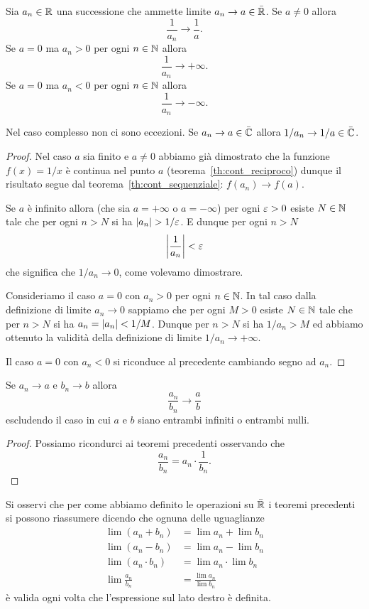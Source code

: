 \begin{theorem}
\label{th:limite_reciproco}
\mymark{**}
Sia $a_n\in \mathbb R$ una successione che ammette limite $a_n \to a\in \bar {\mathbb R}$.
Se $a\neq 0$ allora
\[
  \frac{1}{a_n} \to \frac{1}{a}.
\]
Se $a = 0$ ma $a_n>0$ per ogni $n\in \mathbb N$ allora
\[
  \frac{1}{a_n} \to +\infty.
\]
Se $a=0$ ma $a_n<0$ per ogni $n\in \mathbb N$ allora
\[
  \frac{1}{a_n} \to -\infty.
\]

Nel caso complesso non ci sono eccezioni.
Se $a_n\to a \in \bar {\mathbb C}$ allora $1/a_n \to 1/a\in \bar {\mathbb C}$.
\end{theorem}
%
\begin{proof}
\mymark{*}
Nel caso $a$ sia finito e $a\neq 0$ abbiamo già dimostrato
che la funzione $f(x)=1/x$ è continua nel punto $a$
(teorema~\ref{th:cont_reciproco}) dunque
il risultato segue dal
teorema~\ref{th:cont_sequenziale}: $f(a_n)\to f(a)$.

Se $a$ è infinito allora
(che sia $a=+\infty$ o $a=-\infty$)
per ogni $\varepsilon > 0$ esiste $N\in \mathbb N$ tale che per ogni $n>N$ si ha
${\left|a_n\right|} > 1/\varepsilon$. E dunque per ogni $n>N$
\[
{\left|\frac{1}{a_n}\right|} < \varepsilon
\]
che significa che $1/a_n \to 0$, come volevamo dimostrare.

Consideriamo il caso $a=0$ con $a_n>0$ per ogni $n\in \mathbb N$. In tal caso
dalla definizione di limite $a_n \to 0$ sappiamo che
per ogni $M>0$ esiste $N\in \mathbb N$ tale che per $n>N$ si ha
$a_n = {\left|a_n\right|} < 1/M$. Dunque per $n>N$ si ha $1/a_n > M$ ed
abbiamo ottenuto la validità della definizione di limite $1/a_n \to +\infty$.

Il caso $a=0$ con $a_n<0$ si riconduce al precedente cambiando
segno ad $a_n$.
\end{proof}

\begin{theorem}
\label{th:limite_rapporto}
\mymark{**}
Se $a_n \to a$ e $b_n\to b$ allora
\[
  \frac{a_n}{b_n} \to \frac{a}{b}
\]
escludendo il caso in cui $a$ e $b$ siano entrambi infiniti o entrambi nulli.
\end{theorem}
%
\begin{proof}
\mymark{*}
Possiamo ricondurci ai teoremi precedenti osservando che
\[
   \frac{a_n}{b_n} = a_n \cdot \frac{1}{b_n}.
\]
\end{proof}

Si osservi che
per come abbiamo definito le operazioni
su $\bar {\mathbb R}$
i teoremi precedenti si possono riassumere dicendo
che ognuna delle uguaglianze
\begin{align*}
\lim (a_n + b_n)
&= \lim a_n + \lim b_n \\
\lim (a_n - b_n)
&= \lim a_n - \lim b_n \\
\lim (a_n \cdot b_n)
&= \lim a_n \cdot \lim b_n \\
\lim \frac {a_n}{b_n}
&= \frac{\lim a_n}{\lim b_n}
\end{align*}
è valida ogni volta che l'espressione sul lato destro è definita.
%
